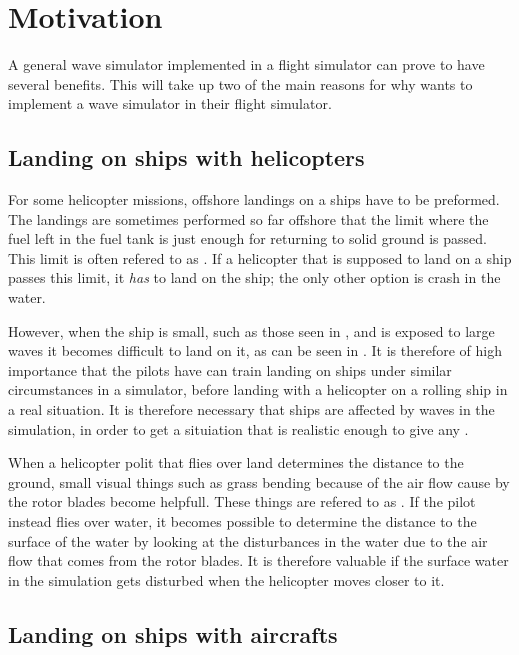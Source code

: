 \chapter{Motivation}

A general wave simulator implemented in a flight simulator can prove to have several benefits. This \levelname will take up two of the main reasons for why \Saab wants to implement a wave simulator in their flight simulator.

\section{Landing on ships with helicopters}

For some helicopter missions, offshore landings on a ships have to be preformed. The landings are sometimes performed so far offshore that the limit where the fuel left in the fuel tank is just enough for returning to solid ground is passed. This limit is often refered to as . If a helicopter that is supposed to land on a ship passes this limit, it \emph{has} to land on the ship; the only other option is crash in the water.

However, when the ship is small, such as those seen in \citep{MrOawal2009,PrismDefence2010,KopulaDK2010}, and is exposed to large waves it becomes difficult to land on it, as can be seen in \citep{PrismDefence2010}. It is therefore of high importance that the pilots have can train landing on ships under similar circumstances in a simulator, before landing with a helicopter on a rolling ship in a real situation. It is therefore necessary that ships are affected by waves in the simulation, in order to get a situiation that is realistic enough to give any .

When a helicopter polit that flies over land determines the distance to the ground, small visual things such as grass bending because of the air flow cause by the rotor blades become helpfull. These things are refered to as . If the pilot instead flies over water, it becomes possible to determine the distance to the surface of the water by looking at the disturbances in the water due to the air flow that comes from the rotor blades. It is therefore valuable if the surface water in the simulation gets disturbed when the helicopter moves closer to it.

\section{Landing on ships with aircrafts}

